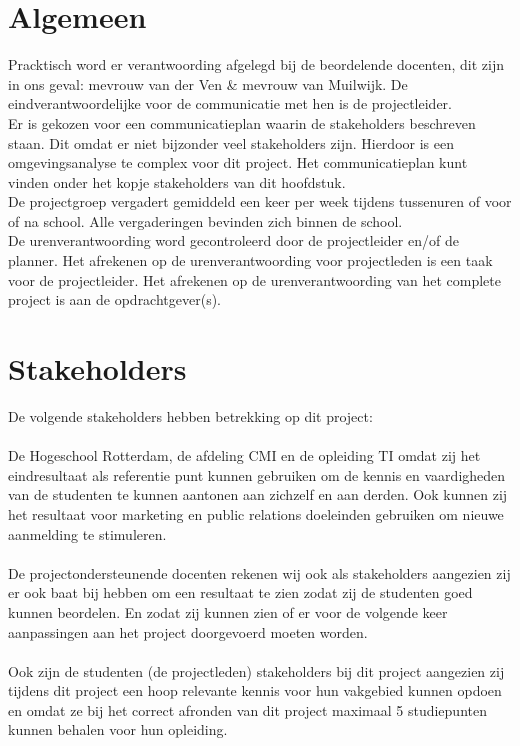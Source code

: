 \documentclass[oneside]{book}
\begin{document}
\section*{Algemeen}
Pracktisch word er verantwoording afgelegd bij de beordelende docenten, dit zijn in ons geval: mevrouw van der Ven \& mevrouw van Muilwijk.
De eindverantwoordelijke voor de communicatie met hen is de projectleider.\\
Er is gekozen voor een communicatieplan waarin de stakeholders beschreven staan.
Dit omdat er niet bijzonder veel stakeholders zijn.
Hierdoor is een omgevingsanalyse te complex voor dit project.
Het communicatieplan kunt vinden onder het kopje stakeholders van dit hoofdstuk.\\
De projectgroep vergadert gemiddeld een keer per week tijdens tussenuren of voor of na school.
Alle vergaderingen bevinden zich binnen de school.\\
De urenverantwoording word gecontroleerd door de projectleider en/of de planner.
Het afrekenen op de urenverantwoording voor projectleden is een taak voor de projectleider.
Het afrekenen op de urenverantwoording van het complete project is aan de opdrachtgever(s).
\section*{Stakeholders}
De volgende stakeholders hebben betrekking op dit project:\\
\\
De Hogeschool Rotterdam, de afdeling CMI en de opleiding TI omdat zij het eindresultaat als
referentie punt kunnen gebruiken om de kennis en vaardigheden van de studenten te kunnen
aantonen aan zichzelf en aan derden.
Ook kunnen zij het resultaat voor marketing en public relations doeleinden gebruiken om nieuwe
aanmelding te stimuleren.\\
\\
De projectondersteunende docenten rekenen wij ook als stakeholders aangezien zij er ook baat bij hebben om een resultaat te zien zodat zij de studenten goed kunnen beordelen.
En zodat zij kunnen zien of er voor de volgende keer aanpassingen aan het project doorgevoerd
moeten worden.\\
\\
Ook zijn de studenten (de projectleden) stakeholders bij dit project aangezien zij tijdens dit project
een hoop relevante kennis voor hun vakgebied kunnen opdoen en omdat ze bij het correct afronden
van dit project maximaal 5 studiepunten kunnen behalen voor hun opleiding.
\clearpage
\end{document}
